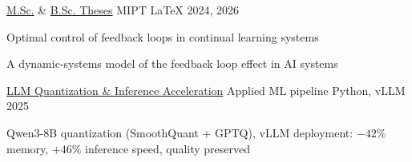 \begin{cventries}
  \cventry
    {\href{https://github.com/Vepricov/Veprikov-MS-Thesis}{M.Sc.} \& \href{https://github.com/Vepricov/Veprikov-BS-Thesis}{B.Sc. Theses}} %
    {MIPT} %
    {LaTeX} %
    {2024, 2026} %
    {
      \begin{cvitems}
        \item {Optimal control of feedback loops in continual learning systems}
        \item {A dynamic-systems model of the feedback loop effect in AI systems}
      \end{cvitems}
    }

  \cventry
    {\href{https://github.com/Vepricov/a2pro-quant-demo}{LLM Quantization \& Inference Acceleration}} %
    {Applied ML pipeline} %
    {Python, vLLM} %
    {2025} %
    {
      \begin{cvitems}
        \item {Qwen3-8B quantization (SmoothQuant + GPTQ), vLLM deployment: $-42\%$ memory, $+46\%$ inference speed, quality preserved}
      \end{cvitems}
    }

\end{cventries}
